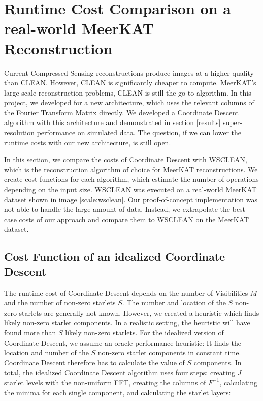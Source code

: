\section{Runtime Cost Comparison on a real-world MeerKAT Reconstruction}\label{scale}
Current Compressed Sensing reconstructions produce images at a higher quality than CLEAN. However, CLEAN is significantly cheaper to compute. MeerKAT's large scale reconstruction problems, CLEAN is still the go-to algorithm. In this project, we developed for a new architecture, which uses the relevant columns of the Fourier Transform Matrix directly. We developed a Coordinate Descent algorithm with this architecture and demonstrated in section \ref{results} super-resolution performance on simulated data. The question, if we can lower the runtime costs with our new architecture, is still open. 

In this section, we compare the costs of Coordinate Descent with WSCLEAN, which is the reconstruction algorithm of choice for MeerKAT reconstructions. We create cost functions for each algorithm, which estimate the number of operations depending on the input size. WSCLEAN was executed on a real-world MeerKAT dataset shown in image \ref{scale:wsclean}. Our proof-of-concept implementation was not able to handle the large amount of data. Instead, we extrapolate the best-case costs of our approach and compare them to WSCLEAN on the MeerKAT dataset.


\subsection{Cost Function of an idealized Coordinate Descent}
The runtime cost of Coordinate Descent depends on the number of Visibilities $M$ and the number of non-zero starlets $S$. The number and location of the $S$ non-zero starlets are generally not known. However, we created a heuristic which finds likely non-zero starlet components. In a realistic setting, the heuristic will have found more than $S$ likely non-zero starlets. For the idealized version of Coordinate Descent, we assume an oracle performance heuristic: It finds the location and number of the $S$ non-zero starlet components in constant time. Coordinate Descent therefore has to calculate the value of $S$  components. In total, the idealized Coordinate Descent algorithm uses four steps: creating $J$ starlet levels with the non-uniform FFT, creating the columns of $F^{-1}$, calculating the minima for each single component, and calculating the starlet layers:

